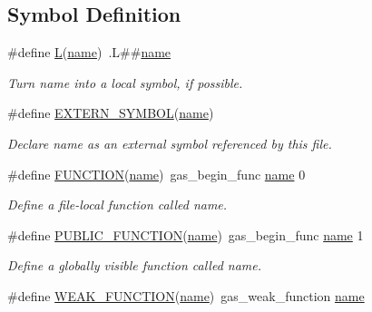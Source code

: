\subsection*{Symbol Definition}
\begin{DoxyCompactItemize}
\item 
\#define \hyperlink{group__assembler__group_ga8e298c540513429b516bba4896bc2e6d}{L}(\hyperlink{gas_8h_a8cc72c7acb2e8c5a34a460a505fece93}{name})~.L\#\#\hyperlink{gas_8h_a8cc72c7acb2e8c5a34a460a505fece93}{name}
\begin{DoxyCompactList}\small\item\em Turn {\itshape name} into a local symbol, if possible. \end{DoxyCompactList}\item 
\#define \hyperlink{group__assembler__group_ga4ec6c5fa246498ad62aa1fae32e0cc63}{E\-X\-T\-E\-R\-N\-\_\-\-S\-Y\-M\-B\-O\-L}(\hyperlink{gas_8h_a8cc72c7acb2e8c5a34a460a505fece93}{name})
\begin{DoxyCompactList}\small\item\em Declare {\itshape name} as an external symbol referenced by this file. \end{DoxyCompactList}\item 
\#define \hyperlink{group__assembler__group_ga4f62d0e155df806b451e332fd5a8e641}{F\-U\-N\-C\-T\-I\-O\-N}(\hyperlink{gas_8h_a8cc72c7acb2e8c5a34a460a505fece93}{name})~gas\-\_\-begin\-\_\-func \hyperlink{gas_8h_a8cc72c7acb2e8c5a34a460a505fece93}{name} 0
\begin{DoxyCompactList}\small\item\em Define a file-\/local function called {\itshape name}. \end{DoxyCompactList}\item 
\#define \hyperlink{group__assembler__group_gae2b2aca7cb222177274d51289b51228f}{P\-U\-B\-L\-I\-C\-\_\-\-F\-U\-N\-C\-T\-I\-O\-N}(\hyperlink{gas_8h_a8cc72c7acb2e8c5a34a460a505fece93}{name})~gas\-\_\-begin\-\_\-func \hyperlink{gas_8h_a8cc72c7acb2e8c5a34a460a505fece93}{name} 1
\begin{DoxyCompactList}\small\item\em Define a globally visible function called {\itshape name}. \end{DoxyCompactList}\item 
\#define \hyperlink{group__assembler__group_ga81ab44c8186c742be6d8b16b9cb09b8b}{W\-E\-A\-K\-\_\-\-F\-U\-N\-C\-T\-I\-O\-N}(\hyperlink{gas_8h_a8cc72c7acb2e8c5a34a460a505fece93}{name})~gas\-\_\-weak\-\_\-function \hyperlink{gas_8h_a8cc72c7acb2e8c5a34a460a505fece93}{name}

\end{DoxyCompactItemize}
